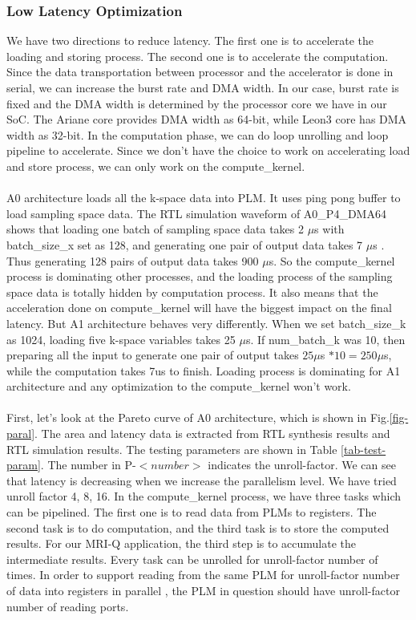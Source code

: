 \subsubsection{Low Latency Optimization}

We have two directions to reduce latency. The first one is to accelerate the
loading and storing process. The second one is to accelerate the
computation. Since the data transportation between processor and the accelerator
is done in serial, we can increase the burst rate and DMA width. In our case,
burst rate is fixed and the DMA width is determined by the processor core we
have in our SoC. The Ariane core provides DMA width as 64-bit, while Leon3 core
has DMA width as 32-bit. In the computation phase, we can do loop unrolling and
loop pipeline to accelerate. Since we don't have the choice to work on
accelerating load and store process, we can only work on the
compute\_kernel. \\ \\
%
A0 architecture loads all the k-space data into PLM. It uses ping pong buffer to
load sampling space data. The RTL simulation waveform of A0\_P4\_DMA64 shows
that loading one batch of sampling space data takes 2 $\mu$s with batch\_size\_x
set as 128, and generating one pair of output data takes 7 $\mu$s . Thus
generating 128 pairs of output data takes 900 $\mu$s. So the compute\_kernel
process is dominating other processes, and the loading process of the sampling
space data is totally hidden by computation process. It also means that the
acceleration done on compute\_kernel will have the biggest impact on the final
latency. But A1 architecture behaves very differently. When we set
batch\_size\_k as 1024, loading five k-space variables takes 25 $\mu$s. If
num\_batch\_k was 10, then preparing all the input to generate one pair of
output takes $25\mu$s $* 10 = 250\mu$s, while the computation takes 7us to
finish. Loading process is dominating for A1 architecture and any optimization
to the compute\_kernel won't work. \\ \\
%
First, let's look at the Pareto curve of A0 architecture, which is shown in
Fig.\ref{fig-paral}. The area and latency data is extracted from RTL synthesis
results and RTL simulation results. The testing parameters are shown in Table
\ref{tab-test-param}. The number in P-$<number>$ indicates the unroll-factor. We
can see that latency is decreasing when we increase the parallelism level. We
have tried unroll factor 4, 8, 16. In the compute\_kernel process, we have three
tasks which can be pipelined. The first one is to read data from PLMs to
registers. The second task is to do computation, and the third task is to store
the computed results. For our MRI-Q application, the third step is to accumulate
the intermediate results. Every task can be unrolled for unroll-factor number of
times. In order to support reading from the same PLM for unroll-factor number of
data into registers in parallel , the PLM in question should have unroll-factor
number of reading ports.

